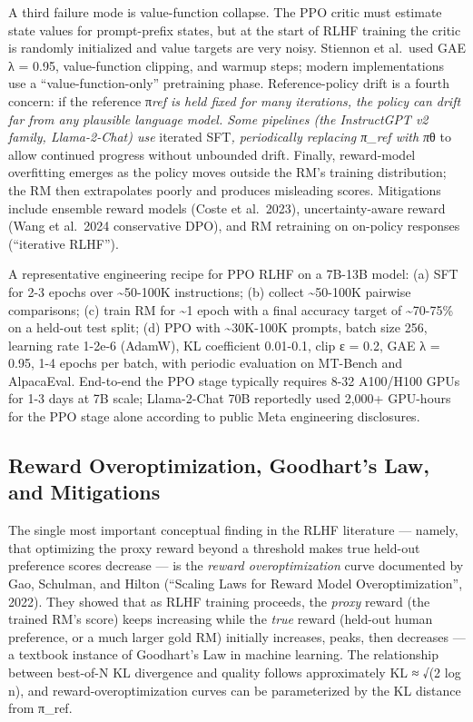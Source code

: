 A third failure mode is value-function collapse. The PPO critic must estimate state values for prompt-prefix states, but at the start of RLHF training the critic is randomly initialized and value targets are very noisy. Stiennon et al.~used GAE λ = 0.95, value-function clipping, and warmup steps; modern implementations use a ``value-function-only'' pretraining phase. Reference-policy drift is a fourth concern: if the reference π\emph{ref is held fixed for many iterations, the policy can drift far from any plausible language model. Some pipelines (the InstructGPT v2 family, Llama-2-Chat) use }iterated SFT\emph{, periodically replacing π\_ref with π}θ to allow continued progress without unbounded drift. Finally, reward-model overfitting emerges as the policy moves outside the RM's training distribution; the RM then extrapolates poorly and produces misleading scores. Mitigations include ensemble reward models (Coste et al.~2023), uncertainty-aware reward (Wang et al.~2024 conservative DPO), and RM retraining on on-policy responses (``iterative RLHF'').

A representative engineering recipe for PPO RLHF on a 7B-13B model: (a) SFT for 2-3 epochs over \textasciitilde50-100K instructions; (b) collect \textasciitilde50-100K pairwise comparisons; (c) train RM for \textasciitilde1 epoch with a final accuracy target of \textasciitilde70-75\% on a held-out test split; (d) PPO with \textasciitilde30K-100K prompts, batch size 256, learning rate 1-2e-6 (AdamW), KL coefficient 0.01-0.1, clip ε = 0.2, GAE λ = 0.95, 1-4 epochs per batch, with periodic evaluation on MT-Bench and AlpacaEval. End-to-end the PPO stage typically requires 8-32 A100/H100 GPUs for 1-3 days at 7B scale; Llama-2-Chat 70B reportedly used 2,000+ GPU-hours for the PPO stage alone according to public Meta engineering disclosures.

\subsection{Reward Overoptimization, Goodhart's Law, and Mitigations}\label{reward-overoptimization-goodharts-law-and-mitigations}

The single most important conceptual finding in the RLHF literature --- namely, that optimizing the proxy reward beyond a threshold makes true held-out preference scores decrease --- is the \emph{reward overoptimization} curve documented by Gao, Schulman, and Hilton (``Scaling Laws for Reward Model Overoptimization'', 2022). They showed that as RLHF training proceeds, the \emph{proxy} reward (the trained RM's score) keeps increasing while the \emph{true} reward (held-out human preference, or a much larger gold RM) initially increases, peaks, then decreases --- a textbook instance of Goodhart's Law in machine learning. The relationship between best-of-N KL divergence and quality follows approximately KL ≈ √(2 log n), and reward-overoptimization curves can be parameterized by the KL distance from π\_ref.

